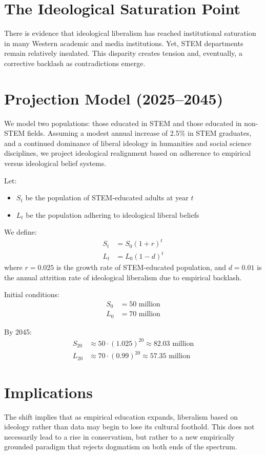 \documentclass[11pt]{article}
\begin{document}
\section{The Ideological Saturation Point}
There is evidence that ideological liberalism has reached institutional saturation in many Western academic and media institutions. Yet, STEM departments remain relatively insulated. This disparity creates tension and, eventually, a corrective backlash as contradictions emerge.

\section{Projection Model (2025--2045)}
We model two populations: those educated in STEM and those educated in non-STEM fields. Assuming a modest annual increase of 2.5\% in STEM graduates, and a continued dominance of liberal ideology in humanities and social science disciplines, we project ideological realignment based on adherence to empirical versus ideological belief systems.

Let:
\begin{itemize}
    \item $S_t$ be the population of STEM-educated adults at year $t$
    \item $L_t$ be the population adhering to ideological liberal beliefs
\end{itemize}

We define:
\begin{align*}
S_t &= S_0(1 + r)^t \\
L_t &= L_0(1 - d)^t
\end{align*}
where $r = 0.025$ is the growth rate of STEM-educated population, and $d = 0.01$ is the annual attrition rate of ideological liberalism due to empirical backlash.

Initial conditions:
\begin{align*}
S_0 &= 50 \text{ million} \\
L_0 &= 70 \text{ million}
\end{align*}

By 2045:
\begin{align*}
S_{20} &\approx 50 \cdot (1.025)^{20} \approx 82.03 \text{ million} \\
L_{20} &\approx 70 \cdot (0.99)^{20} \approx 57.35 \text{ million}
\end{align*}

\section{Implications}
The shift implies that as empirical education expands, liberalism based on ideology rather than data may begin to lose its cultural foothold. This does not necessarily lead to a rise in conservatism, but rather to a new empirically grounded paradigm that rejects dogmatism on both ends of the spectrum.
\end{document}
